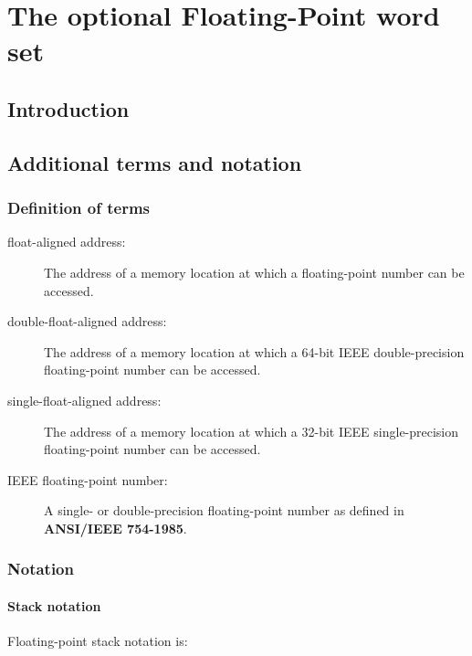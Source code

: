 \chapter{The optional Floating-Point word set} %

\section{Introduction} %

\section{Additional terms and notation} %

\subsection{Definition of terms} %
\label{float:terms}

\begin{description}
\item[float-aligned address:]
	The address of a memory location at which a floating-point
	number can be accessed.

\item[double-float-aligned address:]
	The address of a memory location at which a 64-bit IEEE
	double-precision floating-point number can be accessed.

\item[single-float-aligned address:]
	The address of a memory location at which a 32-bit IEEE
	single-precision floating-point number can be accessed.

\item[IEEE floating-point number:]
	A single- or double-precision floating-point number as defined
	in \textbf{ANSI/IEEE 754-1985}.
\end{description}

\subsection{Notation} %
\label{float:notation}

\subsubsection{Stack notation} %

Floating-point stack notation  is:
\begin{quote}
\end{quote}

